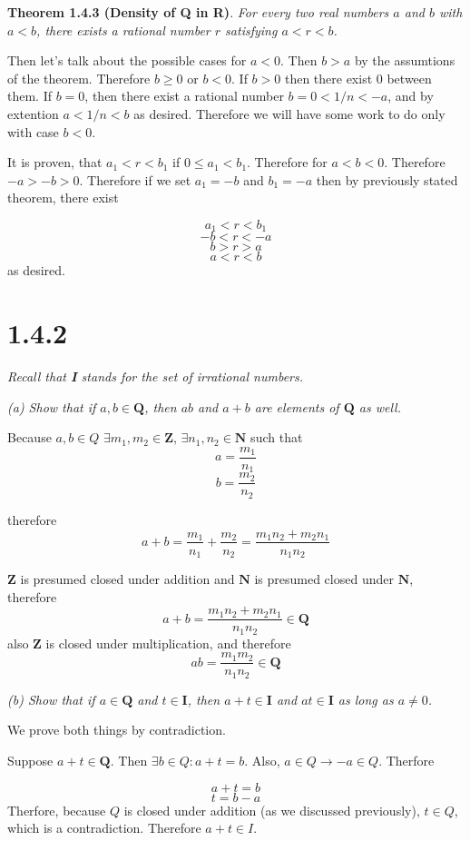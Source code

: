 \documentclass[11pt,oneside,titlepage]{article}
\begin{document}
\textbf{Theorem 1.4.3 (Density of Q in R)}.
\textit{For every two real numbers $a$ and $b$ with $a < b$, there exists a
  rational number $r$ satisfying $a < r < b$.}

Then let's talk about the possible cases for $a < 0$. Then $b > a$ by the
assumtions of the theorem. Therefore $b \geq 0$ or $b < 0$. If $b > 0$ then
there exist 0 between them. If $b = 0$, then there exist a rational number
$b = 0 < 1/n < -a$, and by extention $a < 1/n < b$ as desired. Therefore we
will have some work to do  only with case $b < 0$.

It is  proven, that $a_1 < r < b_1$ if $0 \leq a_1 < b_1$. Therefore for
$a < b < 0$. Therefore $-a > -b > 0$. Therefore if we set $a_1 = -b$ and
$b_1 = -a$ then by previously stated theorem, there exist

$$a_1 < r < b_1$$
$$-b  < r < -a$$
$$b  > r > a$$
$$a < r < b$$
as desired.

\section*{1.4.2}
\textit{Recall that \textbf{I} stands for the set of irrational numbers.}

\textit{(a) Show that if $a,b \in \textbf{Q}$, then $ab$ and $a + b$ are
  elements of $\textbf{Q}$ as well.}

Because $a,b \in Q$ $\exists m_1,m_2 \in \textbf{Z}$, $\exists n_1,n_2 \in
\textbf{N}$ such that
$$a = \frac{m_1}{n_1}$$
$$b = \frac{m_2}{n_2}$$

therefore
$$a + b = \frac{m_1}{n_1} + \frac{m_2}{n_2} =
\frac{m_1 n_2 + m_2 n_1}{n_1 n_2}$$

$\textbf{Z}$ is presumed closed under addition and $\textbf{N}$ is presumed
closed under $\textbf{N}$, therefore 
$$ a + b = \frac{m_1 n_2 + m_2 n_1}{n_1 n_2} \in \textbf{Q}$$
also $\textbf{Z}$ is closed under multiplication, and therefore
$$ a  b = \frac{m_1 m_2}{n_1 n_2} \in \textbf{Q}$$

\textit{(b) Show that if $a \in \textbf{Q}$ and $t \in \textbf{I}$, then
  $a + t \in \textbf{I}$ and $at \in \textbf{I}$ as long as $a \neq 0$.}

We prove both things by contradiction.

Suppose $a + t \in \textbf{Q}$. Then $\exists b \in Q: a + t = b$. Also,
$a \in Q \to -a \in Q$. Therfore

$$a + t = b$$
$$t = b - a$$
Therfore, because $Q$ is closed under addition (as we discussed previously),
$t \in Q$, which is a contradiction. Therefore $a + t \in I$.
\end{document}

